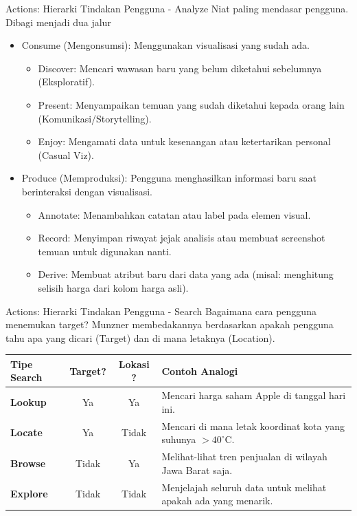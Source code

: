 \documentclass[t]{beamer}
\begin{document}

\begin{frame}{Actions: Hierarki Tindakan Pengguna - Analyze}
Niat paling mendasar pengguna. Dibagi menjadi dua jalur
\begin{itemize}
	\item Consume (Mengonsumsi): Menggunakan visualisasi yang sudah ada.
	\begin{itemize}
		\item Discover: Mencari wawasan baru yang belum diketahui sebelumnya (Eksploratif).
		\item Present: Menyampaikan temuan yang sudah diketahui kepada orang lain (Komunikasi/Storytelling).
		\item Enjoy: Mengamati data untuk kesenangan atau ketertarikan personal (Casual Viz).
	\end{itemize}
	\item Produce (Memproduksi): Pengguna menghasilkan informasi baru saat berinteraksi dengan visualisasi.
	\begin{itemize}
		\item Annotate: Menambahkan catatan atau label pada elemen visual.
		\item Record: Menyimpan riwayat jejak analisis atau membuat screenshot temuan untuk digunakan nanti.
		\item Derive: Membuat atribut baru dari data yang ada (misal: menghitung selisih harga dari kolom harga asli).
	\end{itemize}
\end{itemize}
\end{frame}

\begin{frame}{Actions: Hierarki Tindakan Pengguna - Search}
Bagaimana cara pengguna menemukan target? Munzner membedakannya berdasarkan apakah pengguna tahu apa yang dicari (Target) dan di mana letaknya (Location).
\vspace{-0.2cm}
\begin{table}
    \begin{tabular}{@{} lcc p{6cm} @{}}
        \toprule
        \textbf{Tipe Search} & \textbf{Target?} & \textbf{Lokasi ?} & \textbf{Contoh Analogi} \\ 
        \midrule
        \textbf{Lookup} & Ya & Ya & Mencari harga saham Apple di tanggal hari ini. \\ \addlinespace
        \textbf{Locate} & Ya & Tidak & Mencari di mana letak koordinat kota yang suhunya $> 40^\circ$C. \\ \addlinespace
        \textbf{Browse} & Tidak & Ya & Melihat-lihat tren penjualan di wilayah Jawa Barat saja. \\ \addlinespace
        \textbf{Explore} & Tidak & Tidak & Menjelajah seluruh data untuk melihat apakah ada yang menarik. \\ 
        \bottomrule
    \end{tabular}
\end{table}

\end{frame}
\end{document}
